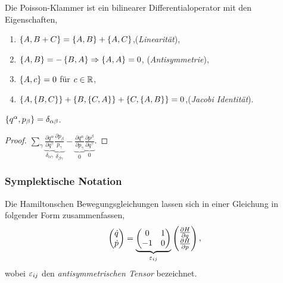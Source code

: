 \begin{propn}[Eigenschaften]
Die Poisson-Klammer ist ein bilinearer Differentialoperator mit den
Eigenschaften,
\begin{enumerate}[label=(\roman{*})]
  \item $\left\{ A,B+C \right\}=\left\{ A,B \right\}+\left\{ A,C \right\}$,\qquad (\textit{Linearität}),
  \item $\left\{ A,B \right\} = -\left\{ B,A \right\} \Rightarrow \left\{ A,A \right\} = 0$,\qquad
  (\textit{Antisymmetrie}),
  \item $\left\{ A,c \right\} = 0$ für $c\in\mathbb{R}$,
  \item $\left\{ A,\left\{ B,C \right\} \right\} + \left\{ B,\left\{ C,A \right\} \right\} + \left\{ C,\left\{ A,B \right\} \right\} =
  0$,\qquad (\textit{Jacobi Identität}).\fishhere
\end{enumerate}
\end{propn}

\begin{bemn}
$\left\{ q^\alpha,p_\beta \right\} = \delta_{\alpha\beta}$.
\begin{proof}
$\sum_\gamma \underbrace{\frac{\partial q^\alpha}{\partial
q^\gamma}}_{\delta_{\alpha\gamma}}
\underbrace{\frac{\partial p_\beta}{p_\gamma}}_{\delta_{\beta\gamma}} -
\underbrace{\frac{\partial q^\alpha}{\partial
p_\gamma}}_{0}\underbrace{\frac{\partial p^\beta}{\partial
q^\gamma}}_{0}$.\qedhere\maphere
\end{proof}
\end{bemn}

\subsubsection{Symplektische Notation}

Die Hamiltonschen Bewegungsgleichungen lassen sich in einer Gleichung in
folgender Form zusammenfassen,
\begin{align*}
\begin{pmatrix}
\dot{q}\\\dot{p}
\end{pmatrix}
=
\underbrace{\begin{pmatrix}
0 & 1\\
-1 & 0
\end{pmatrix}}_{\varepsilon_{ij}}
\begin{pmatrix}
\frac{\partial H}{\partial q}\\
\frac{\partial H}{\partial p}
\end{pmatrix},
\end{align*}
wobei $\varepsilon_{ij}$ den \emph{antisymmetrischen Tensor} bezeichnet.


